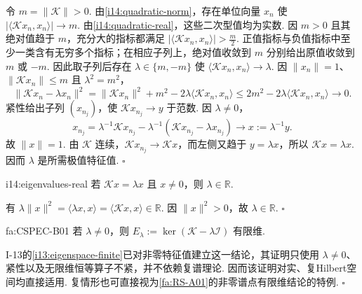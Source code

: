 \begin{FAProof}
令 \(\displaystyle m=\|\mathcal K\|>0\). 由\autoref{i14:quadratic-norm}，存在单位向量 \(\displaystyle x_n\) 使 \(\displaystyle |\langle\mathcal Kx_n,x_n\rangle|\to m\).
由\autoref{i14:quadratic-real}，这些二次型值均为实数. 因 \(\displaystyle m>0\) 且其绝对值趋于 \(\displaystyle m\)，充分大的指标都满足 \(\displaystyle |\langle\mathcal Kx_n,x_n\rangle|>\frac{m}{2}\). 正值指标与负值指标中至少一类含有无穷多个指标；在相应子列上，绝对值收敛到 \(\displaystyle m\) 分别给出原值收敛到 \(\displaystyle m\) 或 \(\displaystyle -m\). 因此取子列后存在 \(\displaystyle \lambda\in\{m,-m\}\) 使 \(\displaystyle \langle\mathcal Kx_n,x_n\rangle\to\lambda\).
因 \(\displaystyle \|x_n\|=1\)、\(\displaystyle \|\mathcal Kx_n\|\leqslant m\) 且 \(\displaystyle \lambda^2=m^2\)，
\[
\|\mathcal Kx_n-\lambda x_n\|^2 = \|\mathcal Kx_n\|^2+m^2 -2\lambda\langle\mathcal Kx_n,x_n\rangle \leqslant 2m^2-2\lambda\langle\mathcal Kx_n,x_n\rangle \to0.
\]
紧性给出子列 \(\displaystyle (x_{n_j})\)，使 \(\displaystyle \mathcal Kx_{n_j}\to y\) 于范数. 因 \(\displaystyle \lambda\neq0\)，
\[
x_{n_j}
=
\lambda^{-1}\mathcal Kx_{n_j}
-
\lambda^{-1}(\mathcal Kx_{n_j}-\lambda x_{n_j})
\to
x:=\lambda^{-1}y.
\]
故 \(\displaystyle \|x\|=1\). 由 \(\displaystyle \mathcal K\) 连续，\(\displaystyle \mathcal Kx_{n_j}\to\mathcal Kx\)，而左侧又趋于 \(\displaystyle y=\lambda x\)，所以 \(\displaystyle \mathcal Kx=\lambda x\). 因而 \(\displaystyle \lambda\) 是所需极值特征值.
\hfill\(\square\)
\end{FAProof}

\begin{FAProposition}[B][自伴算子的特征值为实数]{i14:eigenvalues-real}
若 \(\displaystyle \mathcal Kx=\lambda x\) 且 \(\displaystyle x\neq0\)，则 \(\displaystyle \lambda\in\mathbb R\).
\end{FAProposition}

\begin{FAProof}
有
\(\displaystyle \lambda\|x\|^2 = \langle\lambda x,x\rangle = \langle\mathcal Kx,x\rangle \in \mathbb R\).
因 \(\displaystyle \|x\|^2>0\)，故 \(\displaystyle \lambda\in\mathbb R\).
\hfill\(\square\)
\end{FAProof}

\begin{FATheorem}[B][紧自伴非零特征空间有限维]{fa:CSPEC-B01}
若 \(\displaystyle \lambda\neq0\)，则 \(\displaystyle E_\lambda:=\ker(\mathcal K-\lambda\mathcal I)\) 有限维.
\end{FATheorem}

\begin{FAProof}
I-13的\autoref{i13:eigenspace-finite}已对非零特征值建立这一结论，其证明只使用 \(\displaystyle \lambda\neq0\)、紧性以及无限维恒等算子不紧，并不依赖复谱理论. 因而该证明对实、复Hilbert空间均直接适用. 复情形也可直接视为\autoref{fa:RS-A01}的非零谱点有限维结论的特例.
\hfill\(\square\)
\end{FAProof}

